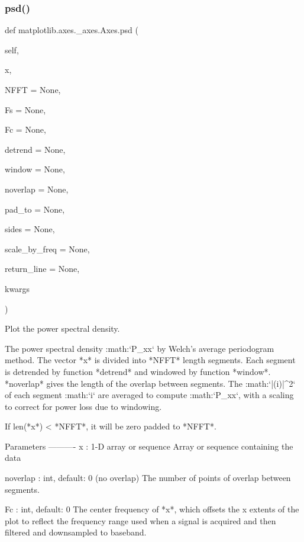 \begin{DoxyVerb}
\subsubsection{\texorpdfstring{psd()}{psd()}}
{\footnotesize\ttfamily def matplotlib.\+axes.\+\_\+axes.\+Axes.\+psd (\begin{DoxyParamCaption}\item[{}]{self,  }\item[{}]{x,  }\item[{}]{N\+F\+FT = {\ttfamily None},  }\item[{}]{Fs = {\ttfamily None},  }\item[{}]{Fc = {\ttfamily None},  }\item[{}]{detrend = {\ttfamily None},  }\item[{}]{window = {\ttfamily None},  }\item[{}]{noverlap = {\ttfamily None},  }\item[{}]{pad\+\_\+to = {\ttfamily None},  }\item[{}]{sides = {\ttfamily None},  }\item[{}]{scale\+\_\+by\+\_\+freq = {\ttfamily None},  }\item[{}]{return\+\_\+line = {\ttfamily None},  }\item[{}]{kwargs }\end{DoxyParamCaption})}

\begin{DoxyVerb}Plot the power spectral density.

The power spectral density :math:`P_{xx}` by Welch's average
periodogram method.  The vector *x* is divided into *NFFT* length
segments.  Each segment is detrended by function *detrend* and
windowed by function *window*.  *noverlap* gives the length of
the overlap between segments.  The :math:`|(i)|^2`
of each segment :math:`i` are averaged to compute :math:`P_{xx}`,
with a scaling to correct for power loss due to windowing.

If len(*x*) < *NFFT*, it will be zero padded to *NFFT*.

Parameters
----------
x : 1-D array or sequence
    Array or sequence containing the data



noverlap : int, default: 0 (no overlap)
    The number of points of overlap between segments.

Fc : int, default: 0
    The center frequency of *x*, which offsets the x extents of the
    plot to reflect the frequency range used when a signal is acquired
    and then filtered and downsampled to baseband.


\end{DoxyVerb}
\end{DoxyVerb}

